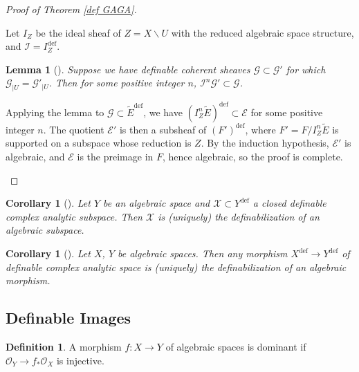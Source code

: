 \documentclass{amsart}
\newtheorem{lemma}[theorem]{Lemma}
\newtheorem{corollary}[theorem]{Corollary}
\theoremstyle{definition}
\newtheorem{definition}[theorem]{Definition}
\numberwithin{equation}{section}
\newcommand{\definable}{\mathrm{def}}
\begin{document}
\begin{proof}[Proof of Theorem \ref{def GAGA}]
\begin{enumerate}[label = {Step \arabic*.}]
        Let $I_Z$ be the ideal sheaf of $Z = X \backslash U$ with the reduced algebraic space structure, and $\mathcal{I} = I_Z^{\definable}$.
        \begin{lemma}[{\cite[Lemma 3.9]{zbMATH07662555}}]
            Suppose we have definable coherent sheaves $\mathcal{G} \subset \mathcal{G}'$
            for which $\mathcal{G}_{|U} = \mathcal{G}'_{|U}$.
            Then for some positive integer $n$, $\mathcal{I}^n\mathcal{G}' \subset \mathcal{G}$.
        \end{lemma}
        Applying the lemma to $\mathcal{G} \subset \widetilde{E}^{\definable}$,
        we have $(I^n_Z\widetilde{E})^{\definable} \subset \mathcal{E}$ for some positive integer $n$.
        The quotient $\mathcal{E}'$ is then a subsheaf of $(F')^{\definable}$, where $F' = F/I^n_Z\widetilde{E}$ is supported on a subspace whose reduction is $Z$.
        By the induction hypothesis, $\mathcal{E}'$ is algebraic,
        and $\mathcal{E}$ is the preimage in $F$,
        hence algebraic, so the proof is complete.
    \end{enumerate}
\end{proof}

\begin{corollary}[{\cite[Corollary 3.10]{zbMATH07662555}}]
    Let $Y$ be an algebraic space and $\mathcal{X} \subset Y^{\definable}$ a closed definable complex analytic subspace.
    Then $\mathcal{X}$ is (uniquely) the definabilization of an algebraic subspace.
\end{corollary}

\begin{corollary}[{\cite[Corollary 3.11]{zbMATH07662555}}]
    Let $X$, $Y$ be algebraic spaces.
    Then any morphism $X^{\definable} \to Y^{\definable}$ of definable complex analytic space is (uniquely) the definabilization of an algebraic morphism.
\end{corollary}

\subsection{Definable Images}

\begin{definition}
    A morphism $f:X \to Y$ of algebraic spaces is dominant if $\mathcal{O}_Y \to f_*\mathcal{O}_X$ is injective.
\end{definition}
\end{document}
